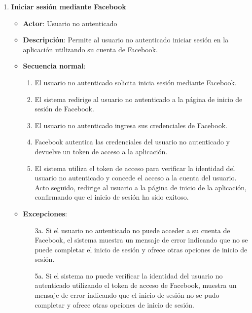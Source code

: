 \begin{enumerate}[label=UC-\protect\twodigits{\arabic*}:, align=left, leftmargin=*]
\item \textbf{Iniciar sesión mediante Facebook}
\begin{itemize}
\item \textbf{Actor}: Usuario no autenticado
\item \textbf{Descripción}: Permite al usuario no autenticado iniciar sesión en la aplicación utilizando su cuenta de Facebook.
\item \textbf{Secuencia normal}:
\begin{enumerate}[label={\arabic*}:]
\item El usuario no autenticado solicita inicia sesión mediante Facebook.
\item El sistema redirige al usuario no autenticado a la página de inicio de sesión de Facebook.
\item El usuario no autenticado ingresa sus credenciales de Facebook.
\item Facebook autentica las credenciales del usuario no autenticado y devuelve un token de acceso a la aplicación.
\item El sistema utiliza el token de acceso para verificar la identidad del usuario no autenticado y concede el acceso a la cuenta del usuario. Acto seguido, redirige al usuario a la página de inicio de la aplicación, confirmando que el inicio de sesión ha sido exitoso.
\end{enumerate}
\item \textbf{Excepciones}:
\begin{itemize}
\item[3a.] Si el usuario no autenticado no puede acceder a su cuenta de Facebook, el sistema muestra un mensaje de error indicando que no se puede completar el inicio de sesión y ofrece otras opciones de inicio de sesión.
\item[5a.] Si el sistema no puede verificar la identidad del usuario no autenticado utilizando el token de acceso de Facebook, muestra un mensaje de error indicando que el inicio de sesión no se pudo completar y ofrece otras opciones de inicio de sesión.
\end{itemize}
\end{itemize}


\end{enumerate}

